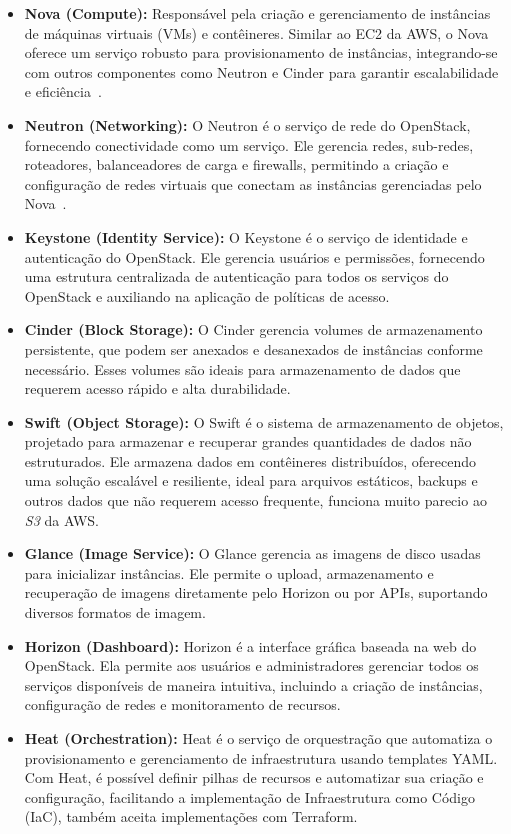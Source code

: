 \begin{itemize}
    \item \textbf{Nova (Compute): } Responsável pela criação e gerenciamento de instâncias de máquinas virtuais (VMs) e contêineres. Similar ao EC2 da AWS, o Nova oferece um serviço robusto para provisionamento de instâncias, integrando-se com outros componentes como Neutron e Cinder para garantir escalabilidade e eficiência~\citep{OpenStackNovaArchitecture}.
    \item \textbf{Neutron (Networking): } O Neutron é o serviço de rede do OpenStack, fornecendo conectividade como um serviço. Ele gerencia redes, sub-redes, roteadores, balanceadores de carga e firewalls, permitindo a criação e configuração de redes virtuais que conectam as instâncias gerenciadas pelo Nova~\citep{OpenStackNeutronArchitecture}.
    \item \textbf{Keystone (Identity Service): } O Keystone é o serviço de identidade e autenticação do OpenStack. Ele gerencia usuários e permissões, fornecendo uma estrutura centralizada de autenticação para todos os serviços do OpenStack e auxiliando na aplicação de políticas de acesso.
    \item \textbf{Cinder (Block Storage): } O Cinder gerencia volumes de armazenamento persistente, que podem ser anexados e desanexados de instâncias conforme necessário. Esses volumes são ideais para armazenamento de dados que requerem acesso rápido e alta durabilidade.
    \item \textbf{Swift (Object Storage): } O Swift é o sistema de armazenamento de objetos, projetado para armazenar e recuperar grandes quantidades de dados não estruturados. Ele armazena dados em contêineres distribuídos, oferecendo uma solução escalável e resiliente, ideal para arquivos estáticos, backups e outros dados que não requerem acesso frequente, funciona muito parecio ao \textit{S3} da AWS.
    \item \textbf{Glance (Image Service): } O Glance gerencia as imagens de disco usadas para inicializar instâncias. Ele permite o upload, armazenamento e recuperação de imagens diretamente pelo Horizon ou por APIs, suportando diversos formatos de imagem.
    \item \textbf{Horizon (Dashboard): } Horizon é a interface gráfica baseada na web do OpenStack. Ela permite aos usuários e administradores gerenciar todos os serviços disponíveis de maneira intuitiva, incluindo a criação de instâncias, configuração de redes e monitoramento de recursos.
    \item \textbf{Heat (Orchestration): } Heat é o serviço de orquestração que automatiza o provisionamento e gerenciamento de infraestrutura usando templates YAML. Com Heat, é possível definir pilhas de recursos e automatizar sua criação e configuração, facilitando a implementação de Infraestrutura como Código (IaC), também aceita implementações com Terraform.

\end{itemize}
